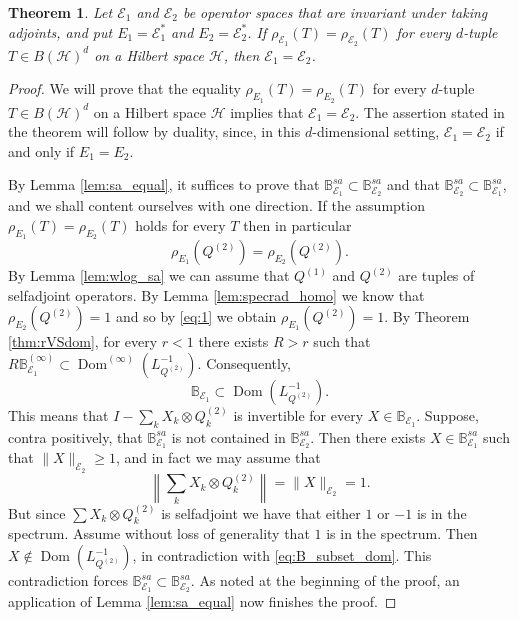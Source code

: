 \documentclass[12pt]{amsart}
\numberwithin{equation}{section}
\newtheorem{theorem}{Theorem}[section]
\theoremstyle{definition}
\newcommand{\be}{\begin{equation}}
\newcommand{\ee}{\end{equation}}
\newcommand{\cE}{\mathcal{E}}
\newcommand{\cH}{\mathcal{H}}
\newcommand{\bB}{\mathbb{B}}
\newcommand{\dom}{\operatorname{Dom}}
\begin{document}
\begin{theorem}\label{thm:rho_E1E2}
    Let $\cE_1$ and $\cE_2$ be operator spaces that are invariant under taking adjoints, and put $E_1 = \cE_1^*$ and $E_2 = \cE_2^*$. If $\rho_{\cE_1}(T) = \rho_{\cE_2}(T)$ for every $d$-tuple $T \in B(\cH)^d$ on a Hilbert space $\cH$, then $\cE_1 = \cE_2$. 
\end{theorem}
\begin{proof}
    We will prove that the equality $\rho_{E_1}(T) = \rho_{E_2}(T)$ for every $d$-tuple $T \in B(\cH)^d$ on a Hilbert space $\cH$ implies that $\cE_1 = \cE_2$. The assertion stated in the theorem will follow by duality, since, in this $d$-dimensional setting, $\cE_1 = \cE_2$ if and only if $E_1 = E_2$. 

    By Lemma \ref{lem:sa_equal}, it suffices to prove that $\bB^{sa}_{\cE_1} \subset \bB^{sa}_{\cE_2}$ and that $\bB^{sa}_{\cE_2} \subset \bB^{sa}_{\cE_1}$, and we shall content ourselves with one direction. 
    If the assumption $\rho_{E_1}(T) = \rho_{E_2}(T)$ holds for every $T$ then in particular 
    \be\label{eq:1}
    \rho_{E_1}(Q^{(2)}) = \rho_{E_2}(Q^{(2)}) .
    \ee
    By Lemma \ref{lem:wlog_sa} we can assume that $Q^{(1)}$ and $Q^{(2)}$ are tuples of selfadjoint operators.
    By Lemma \ref{lem:specrad_homo} we know that $\rho_{E_2}(Q^{(2)}) = 1$ and so by \eqref{eq:1} we obtain $\rho_{E_1}(Q^{(2)}) = 1$. By Theorem \ref{thm:rVSdom}, for every $r<1$ there exists $R>r$ such that $R\bB^{(\infty)}_{\cE_1} \subset \dom^{(\infty)}(L_{Q^{(2)}}^{-1})$. 
    Consequently, 
    \be\label{eq:B_subset_dom}
    \bB_{\cE_1} \subset \dom(L_{Q^{(2)}}^{-1}) . 
    \ee
    This means that $I - \sum_k X_k \otimes Q^{(2)}_k$ is invertible for every $X \in \bB_{\cE_1}$. 
    Suppose, contra positively, that $\bB^{sa}_{\cE_1}$ is not contained in $\bB^{sa}_{\cE_2}$. 
    Then there exists $X \in \bB^{sa}_{\cE_1}$ such that $\|X\|_{\cE_2} \geq 1$, and in fact we may assume that
    \[
    \left\|\sum_k X_k \otimes Q^{(2)}_k \right\| = \|X\|_{\cE_2} = 1.
    \]
    But since $\sum X_k \otimes Q^{(2)}_k$ is selfadjoint we have that either $1$ or $-1$ is in the spectrum. 
    Assume without loss of generality that $1$ is in the spectrum. Then $X \notin \dom(L_{Q^{(2)}}^{-1})$, in contradiction with \eqref{eq:B_subset_dom}. 
    This contradiction forces $\bB^{sa}_{\cE_1} \subset \bB^{sa}_{\cE_2}$. 
    As noted at the beginning of the proof, an application of Lemma \ref{lem:sa_equal} now finishes the proof. 
\end{proof}
\end{document}
